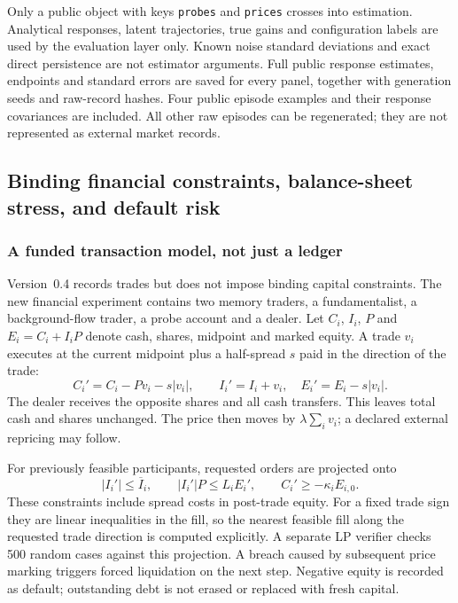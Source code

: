 \documentclass[10pt,twocolumn,letterpaper]{article}
\theoremstyle{definition}
\theoremstyle{remark}
\begin{document}
Only a public object with keys \texttt{probes} and \texttt{prices} crosses into estimation. Analytical responses, latent trajectories, true gains and configuration labels are used by the evaluation layer only. Known noise standard deviations and exact direct persistence are not estimator arguments. Full public response estimates, endpoints and standard errors are saved for every panel, together with generation seeds and raw-record hashes. Four public episode examples and their response covariances are included. All other raw episodes can be regenerated; they are not represented as external market records.



\subsection{Binding financial constraints, balance-sheet stress, and default risk}
\label{sec:binding_finance}
\subsubsection{A funded transaction model, not just a ledger}
Version~0.4 records trades but does not impose binding capital constraints. The new financial experiment contains two memory traders, a fundamentalist, a background-flow trader, a probe account and a dealer. Let $C_i$, $I_i$, $P$ and $E_i=C_i+I_iP$ denote cash, shares, midpoint and marked equity. A trade $v_i$ executes at the current midpoint plus a half-spread $s$ paid in the direction of the trade:
\begin{equation}
 C_i'=C_i-Pv_i-s|v_i|,\qquad I_i'=I_i+v_i,
 \quad E_i'=E_i-s|v_i|.
 \label{eq:funded_settlement}
\end{equation}
The dealer receives the opposite shares and all cash transfers. This leaves total cash and shares unchanged. The price then moves by $\lambda\sum_i v_i$; a declared external repricing may follow.

For previously feasible participants, requested orders are projected onto
\begin{equation}
 |I_i'|\le \overline I_i,\qquad |I_i'|P\le L_i E_i',\qquad
 C_i'\ge-\kappa_i E_{i,0}.
 \label{eq:binding_limits}
\end{equation}
These constraints include spread costs in post-trade equity. For a fixed trade sign they are linear inequalities in the fill, so the nearest feasible fill along the requested trade direction is computed explicitly. A separate LP verifier checks 500 random cases against this projection. A breach caused by subsequent price marking triggers forced liquidation on the next step. Negative equity is recorded as default; outstanding debt is not erased or replaced with fresh capital.
\end{document}
